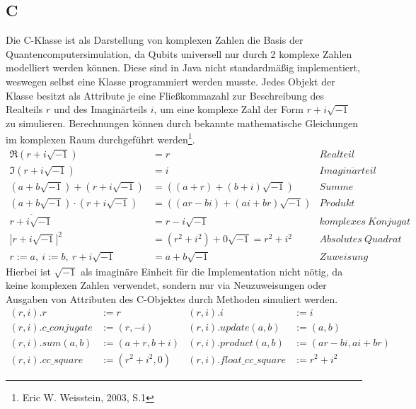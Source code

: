 \documentclass[12pt]{report}
\begin{document}
\subsection{C}
Die \glqq C\grqq{}-Klasse ist als Darstellung von komplexen Zahlen die Basis der Quantencomputersimulation, da Qubits universell nur durch 2 komplexe Zahlen modelliert werden können. Diese sind in Java nicht standardmäßig implementiert, weswegen selbst eine Klasse programmiert werden musste. Jedes Objekt der Klasse besitzt als Attribute je eine Fließkommazahl zur Beschreibung des Realteils $r$ und des Imaginärteils $i$, um eine komplexe Zahl der Form $r+i\sqrt{-1}$ zu simulieren.
Berechnungen können durch bekannte mathematische Gleichungen im komplexen Raum durchgeführt werden\footnote{Eric W. Weisstein, 2003, S.1}.
\begin{align}
	\Re(r+i\sqrt{-1}) &= r & Realteil\\
	\Im(r+i\sqrt{-1}) &= i & Imagin\ddot{a} rteil\\
	(a+b\sqrt{-1}) + (r+i\sqrt{-1}) &= ((a+r)+(b+i)\sqrt{-1}) & Summe\\
	(a+b\sqrt{-1}) \cdot (r+i\sqrt{-1}) &= ((ar-bi)+(ai+br)\sqrt{-1}) & Produkt\\
	\overline{r+i\sqrt{-1}} &= r-i\sqrt{-1} & komplexes~Konjugat\\
	|r+i\sqrt{-1}|^2 &= (r^2+i^2)+0\sqrt{-1} = r^2+i^2 & Absolutes~Quadrat\\
	r:=a,~ i:=b,~ r+i\sqrt{-1} &= a+b\sqrt{-1} & Zuweisung
\end{align}
Hierbei ist $\sqrt{-1}$ als imaginäre Einheit für die Implementation nicht nötig, da keine komplexen Zahlen verwendet, sondern nur via Neuzuweisungen oder Ausgaben von Attributen des \glqq C\grqq{}-Objektes durch Methoden simuliert werden.
\begin{align}
	(r,i).r &:= r & (r,i).i &:= i \\
	(r,i).c\_conjugate &:= (r,-i) & (r,i).update(a,b) &:= (a,b) \\
	(r,i).sum(a,b) &:= (a+r,b+i) & (r,i).product(a,b) &:= (ar-bi,ai+br)\\ 
	(r,i).cc\_square &:= (r^2+i^2,0) & (r,i).float\_cc\_square &:= r^2+i^2
\end{align}
\end{document}
